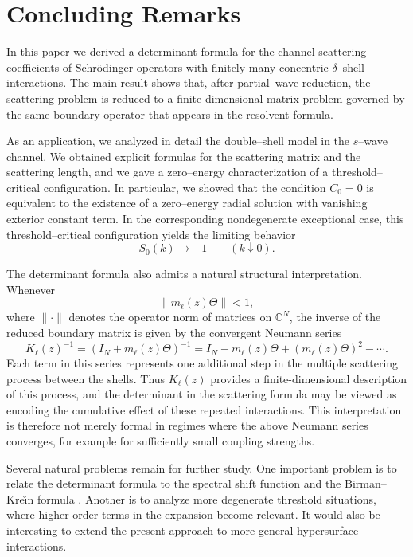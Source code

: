 \documentclass[a4paper,11pt]{article}
\numberwithin{equation}{section}
\newcommand{\C}{\mathbb{C}}
\theoremstyle{definition}
\theoremstyle{remark}
\begin{document}
\section*{Concluding Remarks}

In this paper we derived a determinant formula for the channel scattering
coefficients of Schr\"odinger operators with finitely many concentric
$\delta$--shell interactions. The main result shows that, after partial--wave
reduction, the scattering problem is reduced to a finite-dimensional matrix
problem governed by the same boundary operator that appears in the resolvent
formula.

As an application, we analyzed in detail the double--shell model in the
$s$--wave channel. We obtained explicit formulas for the scattering matrix and
the scattering length, and we gave a zero--energy characterization of a
threshold--critical configuration. In particular, we showed that the condition
$C_0=0$ is equivalent to the existence of a zero--energy radial solution with
vanishing exterior constant term. In the corresponding nondegenerate
exceptional case, this threshold--critical configuration yields the limiting
behavior
$$
S_0(k)\to -1
\qquad (k\downarrow0).
$$

The determinant formula also admits a natural structural interpretation.
Whenever
$$
\|m_\ell(z)\Theta\|<1,
$$
where $\|\cdot\|$ denotes the operator norm of matrices on $\C^N$,
the inverse of the reduced boundary matrix is given by the convergent
Neumann series
$$
K_\ell(z)^{-1}
=
(I_N+m_\ell(z)\Theta)^{-1}
=
I_N-m_\ell(z)\Theta+(m_\ell(z)\Theta)^2-\cdots.
$$
Each term in this series represents one additional step in the multiple
scattering process between the shells.
Thus $K_\ell(z)$ provides a finite-dimensional description of this process,
and the determinant in the scattering formula may be viewed as encoding the
cumulative effect of these repeated interactions. This interpretation is
therefore not merely formal in regimes where the above Neumann series
converges, for example for sufficiently small coupling strengths.

Several natural problems remain for further study. One important problem is
to relate the determinant formula to the spectral shift function and the
Birman--Kre\u{\i}n formula \cite{BirmanKrein1962}. Another is
to analyze more degenerate threshold situations, where higher-order terms in
the expansion become relevant. It would also be interesting to extend the
present approach to more general hypersurface interactions.
\end{document}
